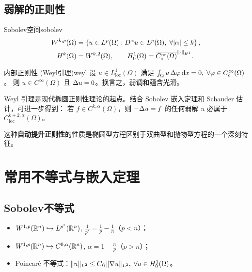 \documentclass[11pt,a4paper,openany,oneside]{ctexbook}
\begin{document}
\section{弱解的正则性}

\begin{definition}{Sobolev空间}{sobolev}
  \begin{align*}
    W^{k,p}(\Omega) &= \left\{ u\in L^{p}(\Omega) : D^{\alpha}u\in L^{p}(\Omega),\;
                        \forall|\alpha|\le k \right\},\\
    H^{k}(\Omega) &= W^{k,2}(\Omega),\qquad
    H_{0}^{1}(\Omega) = \overline{C_{c}^{\infty}(\Omega)}^{\|\cdot\|_{H^{1}}}.
  \end{align*}
\end{definition}

\begin{theorem}{内部正则性 (Weyl引理)}{weyl}
  设 $u\in L_{\text{loc}}^{1}(\Omega)$ 满足
  $\int_{\Omega} u\,\Delta \varphi\,\mathrm{d} x = 0,\;\forall\varphi\in C_{c}^{\infty}(\Omega)$。
  则 $u\in C^{\infty}(\Omega)$ 且 $\Delta u=0$。换言之，弱调和蕴含光滑。
\end{theorem}

\begin{remarkbox}
  Weyl 引理是现代椭圆正则性理论的起点。结合 Sobolev 嵌入定理和
  Schauder 估计，可进一步得到：
  若 $f\in C^{k,\alpha}(\Omega)$，则 $-\Delta u=f$ 的任何弱解
  $u$ 必属于 $C^{k+2,\alpha}_{\text{loc}}(\Omega)$。
  \medskip

  这种\textbf{自动提升正则性}的性质是椭圆型方程区别于双曲型和抛物型方程的一个深刻特征。
\end{remarkbox}

\appendix
\chapter{常用不等式与嵌入定理}

\section{Sobolev不等式}
\begin{itemize}
  \item $W^{1,p}(\mathbb{R}^{n})\hookrightarrow L^{p^{*}}(\mathbb{R}^{n})$,
        $\frac{1}{p^{*}}=\frac{1}{p}-\frac{1}{n}$（$p<n$）；
  \item $W^{1,p}(\mathbb{R}^{n})\hookrightarrow C^{0,\alpha}(\mathbb{R}^{n})$,
        $\alpha=1-\frac{n}{p}$（$p>n$）；
  \item Poincar\'e 不等式：$\|u\|_{L^{2}}\le C_{\Omega}\|\nabla u\|_{L^{2}},\;
        \forall u\in H_{0}^{1}(\Omega)$。
\end{itemize}
\end{document}
